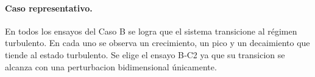 


\paragraph{Caso representativo.} En todos los ensayos del Caso B se logra que el sistema transicione al régimen turbulento. En cada uno se observa un crecimiento, un pico y un decaimiento que tiende al estado turbulento. Se elige el ensayo B‑C2 ya que su transicion se alcanza con una perturbacion bidimensional únicamente.   

\begin{table}[H]
\centering
\caption{Parámetros de las condiciones iniciales para el caso B (Re$_o$ = 5000, Pr = 0.71, Ri$_b$ = 1.06).}
\label{tab:grupo2}
\end{table}

